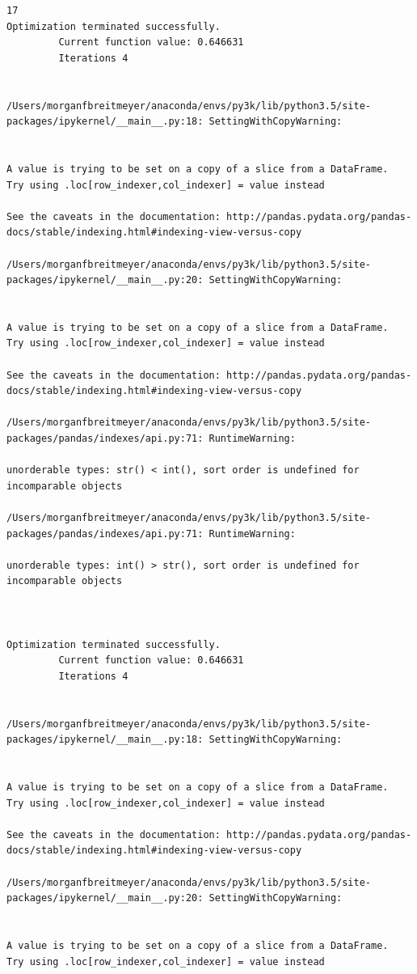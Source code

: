 \begin{lstlisting}
17
Optimization terminated successfully.
         Current function value: 0.646631
         Iterations 4


/Users/morganfbreitmeyer/anaconda/envs/py3k/lib/python3.5/site-packages/ipykernel/__main__.py:18: SettingWithCopyWarning:


A value is trying to be set on a copy of a slice from a DataFrame.
Try using .loc[row_indexer,col_indexer] = value instead

See the caveats in the documentation: http://pandas.pydata.org/pandas-docs/stable/indexing.html#indexing-view-versus-copy

/Users/morganfbreitmeyer/anaconda/envs/py3k/lib/python3.5/site-packages/ipykernel/__main__.py:20: SettingWithCopyWarning:


A value is trying to be set on a copy of a slice from a DataFrame.
Try using .loc[row_indexer,col_indexer] = value instead

See the caveats in the documentation: http://pandas.pydata.org/pandas-docs/stable/indexing.html#indexing-view-versus-copy

/Users/morganfbreitmeyer/anaconda/envs/py3k/lib/python3.5/site-packages/pandas/indexes/api.py:71: RuntimeWarning:

unorderable types: str() < int(), sort order is undefined for incomparable objects

/Users/morganfbreitmeyer/anaconda/envs/py3k/lib/python3.5/site-packages/pandas/indexes/api.py:71: RuntimeWarning:

unorderable types: int() > str(), sort order is undefined for incomparable objects



Optimization terminated successfully.
         Current function value: 0.646631
         Iterations 4


/Users/morganfbreitmeyer/anaconda/envs/py3k/lib/python3.5/site-packages/ipykernel/__main__.py:18: SettingWithCopyWarning:


A value is trying to be set on a copy of a slice from a DataFrame.
Try using .loc[row_indexer,col_indexer] = value instead

See the caveats in the documentation: http://pandas.pydata.org/pandas-docs/stable/indexing.html#indexing-view-versus-copy

/Users/morganfbreitmeyer/anaconda/envs/py3k/lib/python3.5/site-packages/ipykernel/__main__.py:20: SettingWithCopyWarning:


A value is trying to be set on a copy of a slice from a DataFrame.
Try using .loc[row_indexer,col_indexer] = value instead


\end{lstlisting}

